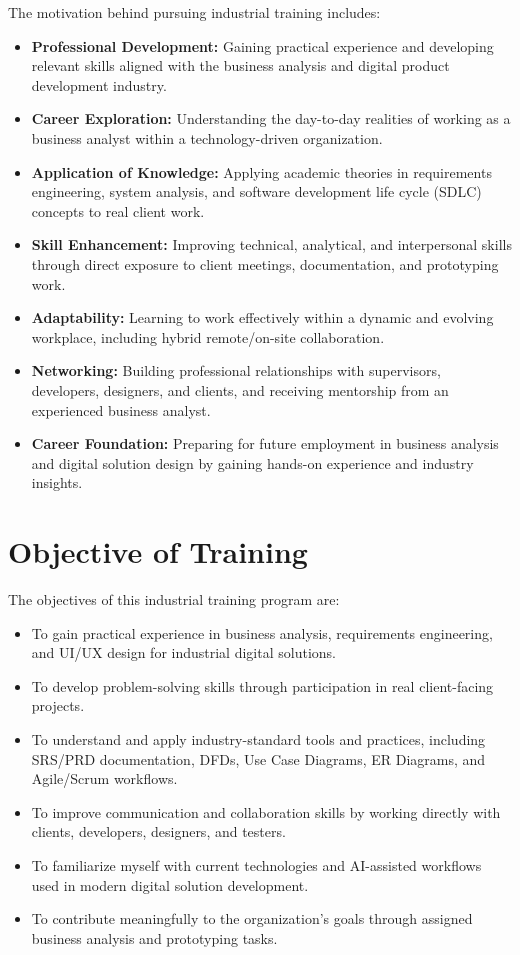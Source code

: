 \par The motivation behind pursuing industrial training includes:

\begin{itemize}
    \item \textbf{Professional Development:} Gaining practical experience and developing relevant skills aligned with the business analysis and digital product development industry.
    \item \textbf{Career Exploration:} Understanding the day-to-day realities of working as a business analyst within a technology-driven organization.
    \item \textbf{Application of Knowledge:} Applying academic theories in requirements engineering, system analysis, and software development life cycle (SDLC) concepts to real client work.
    \item \textbf{Skill Enhancement:} Improving technical, analytical, and interpersonal skills through direct exposure to client meetings, documentation, and prototyping work.
    \item \textbf{Adaptability:} Learning to work effectively within a dynamic and evolving workplace, including hybrid remote/on-site collaboration.
    \item \textbf{Networking:} Building professional relationships with supervisors, developers, designers, and clients, and receiving mentorship from an experienced business analyst.
    \item \textbf{Career Foundation:} Preparing for future employment in business analysis and digital solution design by gaining hands-on experience and industry insights.
\end{itemize}

\section{Objective of Training}

\par The objectives of this industrial training program are:

\begin{itemize}
    \item To gain practical experience in business analysis, requirements engineering, and UI/UX design for industrial digital solutions.
    \item To develop problem-solving skills through participation in real client-facing projects.
    \item To understand and apply industry-standard tools and practices, including SRS/PRD documentation, DFDs, Use Case Diagrams, ER Diagrams, and Agile/Scrum workflows.
    \item To improve communication and collaboration skills by working directly with clients, developers, designers, and testers.
    \item To familiarize myself with current technologies and AI-assisted workflows used in modern digital solution development.
    \item To contribute meaningfully to the organization's goals through assigned business analysis and prototyping tasks.
\end{itemize}

